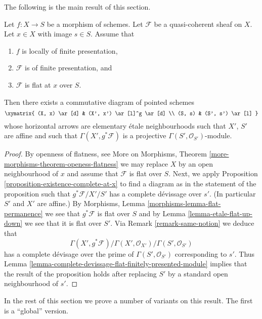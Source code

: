 \noindent
The following is the main result of this section.

\begin{proposition}
\label{proposition-finite-presentation-flat-at-point}
Let $f : X \to S$ be a morphism of schemes.
Let $\mathcal{F}$ be a quasi-coherent sheaf on $X$.
Let $x \in X$ with image $s \in S$.
Assume that
\begin{enumerate}
\item $f$ is locally of finite presentation,
\item $\mathcal{F}$ is of finite presentation, and
\item $\mathcal{F}$ is flat at $x$ over $S$.
\end{enumerate}
Then there exists a commutative diagram of pointed schemes
$$
\xymatrix{
(X, x) \ar[d] & (X', x') \ar[l]^g \ar[d] \\
(S, s) & (S', s') \ar[l]
}
$$
whose horizontal arrows are elementary \'etale neighbourhoods
such that $X'$, $S'$ are affine and such that
$\Gamma(X', g^*\mathcal{F})$ is a projective
$\Gamma(S', \mathcal{O}_{S'})$-module.
\end{proposition}

\begin{proof}
By openness of flatness, see
More on Morphisms, Theorem \ref{more-morphisms-theorem-openess-flatness}
we may replace $X$ by an open neighbourhood of $x$ and assume that
$\mathcal{F}$ is flat over $S$. Next, we apply
Proposition \ref{proposition-existence-complete-at-x}
to find a diagram as in the statement of the proposition such
that $g^*\mathcal{F}/X'/S'$ has a complete d\'evissage over $s'$.
(In particular $S'$ and $X'$ are affine.) By
Morphisms, Lemma \ref{morphisms-lemma-flat-permanence}
we see that $g^*\mathcal{F}$ is flat over $S$ and by
Lemma \ref{lemma-etale-flat-up-down}
we see that it is flat over $S'$. Via
Remark \ref{remark-same-notion}
we deduce that
$$
\Gamma(X', g^*\mathcal{F})/
\Gamma(X', \mathcal{O}_{X'})/
\Gamma(S', \mathcal{O}_{S'})
$$
has a complete d\'evisage over the prime of $\Gamma(S', \mathcal{O}_{S'})$
corresponding to $s'$. Thus
Lemma \ref{lemma-complete-devissage-flat-finitely-presented-module}
implies that the result of the proposition holds after replacing
$S'$ by a standard open neighbourhood of $s'$.
\end{proof}

\noindent
In the rest of this section we prove a number of variants
on this result. The first is a ``global'' version.

